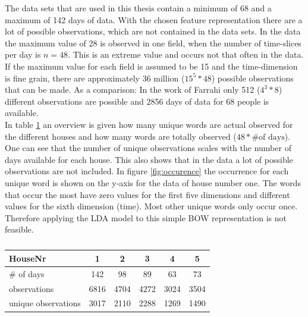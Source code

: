 The data sets that are used in this thesis contain a minimum of 68 and a maximum of 142 days of data. With the chosen feature representation there are a lot of possible observations, which are not contained in the data sets. In the data the maximum value of 28 is observed in one field, when the number of time-slices per day is $n=48$. This is an extreme value and occurs not that often in the data. If the maximum value for each field is assumed to be 15 and the time-dimension is fine grain, there are approximately 36 million ($15^5*48$) possible observations that can be made. As a comparison: In the work of Farrahi \cite{farrahi2008daily} only 512 ($4^3*8$) different observations are possible and 2856 days of data for 68 people is available.\\
In table \ref{tab:features} an overview is given how many unique words are actual observed for the different houses and how many words are totally observed ($48*\text{\# of days}$). One can see that the number of unique observations scales with the number of days available for each house. This also shows that in the data a lot of possible observations are not included. In figure \ref{fig:occurence} the occurrence for each unique word is shown on the y-axis for the data of house number one. The words that occur the most have zero values for the first five dimensions and different values for the sixth dimension (time). Most other unique words only occur once. Therefore applying the LDA model to this simple BOW representation is not feasible.\\


\begin{table}
\caption{}
 \centering
 \begin{tabular}{l c c c c c}
  HouseNr & 1 & 2 & 3 & 4 & 5\\
  \hline
  \# of days & 142 & 98 & 89 & 63 & 73 \\
  observations & 6816 & 4704 & 4272 & 3024 & 3504 \\
  unique observations & 3017 & 2110 & 2288 & 1269 & 1490\\
 \end{tabular}
 \label{tab:features}
\end{table}



